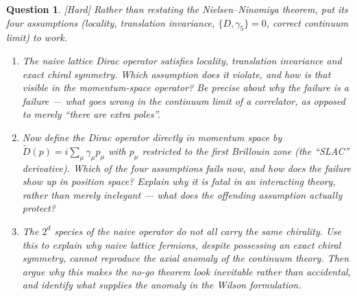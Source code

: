 \documentclass[11pt]{article}
\newcommand{\diff}[1]{\textcolor{blue!60!black}{\footnotesize\textsf{[#1]}}\quad}
\newtheorem{question}{Question}
\begin{document}
\begin{question}
\diff{Hard} Rather than restating the Nielsen--Ninomiya theorem, put its four assumptions (locality, translation invariance, $\{D,\gamma_5\}=0$, correct continuum limit) to work.
\begin{enumerate}[label=(\roman*), leftmargin=*]
  \item The naive lattice Dirac operator satisfies locality, translation invariance and exact chiral symmetry. Which assumption does it violate, and how is that visible in the momentum-space operator? Be precise about \emph{why} the failure is a failure --- what goes wrong in the continuum limit of a correlator, as opposed to merely ``there are extra poles''.
  \item Now define the Dirac operator directly in momentum space by $\tilde D(p) = i\sum_\mu \gamma_\mu p_\mu$ with $p_\mu$ restricted to the first Brillouin zone (the ``SLAC'' derivative). Which of the four assumptions fails now, and how does the failure show up in position space? Explain why it is fatal in an \emph{interacting} theory, rather than merely inelegant --- what does the offending assumption actually protect?
  \item The $2^d$ species of the naive operator do not all carry the same chirality. Use this to explain why naive lattice fermions, despite possessing an exact chiral symmetry, cannot reproduce the axial anomaly of the continuum theory. Then argue why this makes the no-go theorem look inevitable rather than accidental, and identify what supplies the anomaly in the Wilson formulation.
\end{enumerate}
\end{question}
\end{document}
